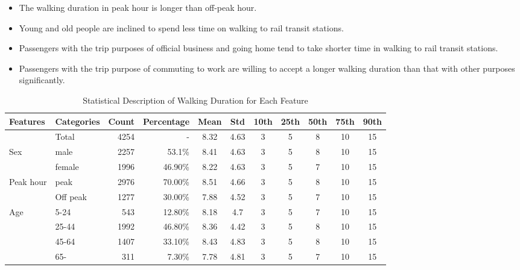 %
\begin{itemize}
	\item The walking duration in peak hour is longer than off-peak hour.
	\item Young and old people are inclined to spend less time on walking to rail transit stations.
	\item Passengers with the trip purposes of official business and going home tend to take shorter time in walking to rail transit stations.
	\item Passengers with the trip purpose of commuting to work are willing to accept a longer walking duration than that with other purposes significantly.
\end{itemize}


\begin{sidewaystable}[htbp]
	\caption{Statistical Description of Walking Duration for Each Feature}
	\label{tab:chp4:StatisticalDescription}
	\centering
	\small
	\renewcommand{\arraystretch}{1.25}
	\begin{tabular}{llrrccccccc}
		\Xhline{1.5pt}
		Features & Categories & Count & Percentage & Mean & Std & 10th & 25th & 50th & 75th & 90th\\
		
		\midrule
		& Total    & 4254  & -         & 8.32  & 4.63  & 3     & 5     & 8     & 10    & 15 \\
		
		\midrule
		\multicolumn{1}{l}{Sex}
		& male     & 2257  & 53.1\%    & 8.41  & 4.63  & 3     & 5     & 8     & 10    & 15 \\
		& female   & 1996  & 46.90\%   & 8.22  & 4.63  & 3     & 5     & 7     & 10    & 15 \\
		
		\midrule
		\multicolumn{1}{l}{Peak hour}
		& peak     & 2976  & 70.00\%   & 8.51  & 4.66  & 3     & 5     & 8     & 10    & 15 \\
		& Off peak & 1277  & 30.00\%   & 7.88  & 4.52  & 3     & 5     & 7     & 10    & 15 \\
		
		\midrule
		\multicolumn{1}{l}{Age}
		& 5-24     & 543   & 12.80\%   & 8.18  & 4.7   & 3     & 5     & 7     & 10    & 15 \\
		& 25-44    & 1992  & 46.80\%   & 8.36  & 4.42  & 3     & 5     & 8     & 10    & 15 \\
		& 45-64    & 1407  & 33.10\%   & 8.43  & 4.83  & 3     & 5     & 8     & 10    & 15 \\
		& 65-      & 311   &  7.30\%   & 7.78  & 4.81  & 3     & 5     & 7     & 10    & 15 \\
		

\end{tabular}
\end{sidewaystable}
